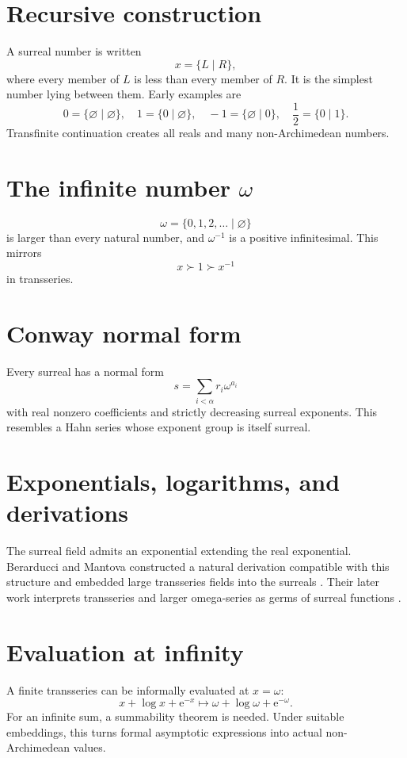 \documentclass[11pt,oneside,openany]{book}
\newcommand{\e}{\mathrm{e}}
\theoremstyle{plain}
\theoremstyle{definition}
\theoremstyle{remark}
\begin{document}
\section{Recursive construction}
A surreal number is written
\[
  x=\{L\mid R\},
\]
where every member of $L$ is less than every member of $R$. It is the simplest number lying between them. Early examples are
\[
  0=\{\varnothing\mid\varnothing\},
  \quad1=\{0\mid\varnothing\},
  \quad-1=\{\varnothing\mid0\},
  \quad\frac12=\{0\mid1\}.
\]
Transfinite continuation creates all reals and many non-Archimedean numbers.

\section{The infinite number \texorpdfstring{$\omega$}{omega}}
\[
  \omega=\{0,1,2,\ldots\mid\varnothing\}
\]
is larger than every natural number, and $\omega^{-1}$ is a positive infinitesimal. This mirrors
\[
  x\succ1\succ x^{-1}
\]
in transseries.

\section{Conway normal form}
Every surreal has a normal form
\[
  s=\sum_{i<\alpha}r_i\omega^{a_i}
\]
with real nonzero coefficients and strictly decreasing surreal exponents. This resembles a Hahn series whose exponent group is itself surreal.

\section{Exponentials, logarithms, and derivations}
The surreal field admits an exponential extending the real exponential. Berarducci and Mantova constructed a natural derivation compatible with this structure and embedded large transseries fields into the surreals \cite{BerarducciMantova2018}. Their later work interprets transseries and larger omega-series as germs of surreal functions \cite{BerarducciMantovaGerms}.

\section{Evaluation at infinity}
A finite transseries can be informally evaluated at $x=\omega$:
\[
  x+\log x+\e^{-x}
  \longmapsto
  \omega+\log\omega+\e^{-\omega}.
\]
For an infinite sum, a summability theorem is needed. Under suitable embeddings, this turns formal asymptotic expressions into actual non-Archimedean values.
\end{document}
